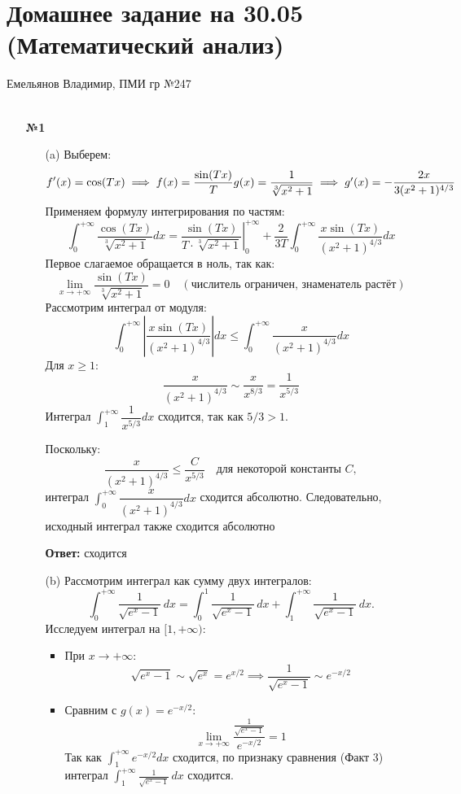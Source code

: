 \documentclass[a4paper]{article}
\renewcommand{\geq}{\geqslant}
\renewcommand{\leq}{\leqslant}
\begin{document}
\section*{Домашнее задание на 30.05 (Математический анализ)}
{\large Емельянов Владимир, ПМИ гр №247}\\\\
\begin{enumerate}
  \item[\textbf{№1}]\begin{enumerate}
    \item[(a)]
    Выберем:  
     \[
     f'(x) = \cos(Tx) \implies f(x) = \dfrac{\sin(Tx)}{T} $$
     $$ g(x) =
      \dfrac{1}{\sqrt[3]{x^2 + 1}} \implies g'(x) = -\dfrac{2x}{3(x^2 + 1)^{4/3}}
     \]  
     Применяем формулу интегрирования по частям:  
     \[
     \int_{0}^{+\infty} \dfrac{\cos(Tx)}{\sqrt[3]{x^2 + 1}} dx = 
     \left. \dfrac{\sin(Tx)}{T \cdot \sqrt[3]{x^2 + 1}} \right|_{0}^{+\infty} +
      \dfrac{2}{3T} \int_{0}^{+\infty} \dfrac{x \sin(Tx)}{(x^2 + 1)^{4/3}} dx
     \]  
     Первое слагаемое обращается в ноль, так как:  
     \[
     \lim_{x \to +\infty} \dfrac{\sin(Tx)}{\sqrt[3]{x^2 + 1}} =
      0 \quad (\text{числитель ограничен, знаменатель растёт})
     \]
     Рассмотрим интеграл от модуля:  
     \[
     \int_{0}^{+\infty} \left| \dfrac{x \sin(Tx)}{(x^2 + 1)^{4/3}}
      \right| dx \leq \int_{0}^{+\infty} \dfrac{x}{(x^2 + 1)^{4/3}} dx
     \]  
     Для \(x \geq 1\):  
     \[
     \dfrac{x}{(x^2 + 1)^{4/3}} \sim \dfrac{x}{x^{8/3}} = \dfrac{1}{x^{5/3}}
     \]  
     Интеграл \(\int_{1}^{+\infty} \dfrac{1}{x^{5/3}} dx\) сходится, так как \(5/3 > 1\).
  
      Поскольку:  
     \[
     \dfrac{x}{(x^2 + 1)^{4/3}} \leq \dfrac{C}{x^{5/3}} \quad 
     \text{для некоторой константы } C,
     \]  
     интеграл \(\int_{0}^{+\infty} \dfrac{x}{(x^2 + 1)^{4/3}} dx\) сходится абсолютно. 
     Следовательно, исходный интеграл также сходится абсолютно
    
     \textbf{Ответ: } сходится\\

     \item[(b)]Рассмотрим интеграл как сумму двух интегралов:  
    \[
    \int_{0}^{+\infty} \frac{1}{\sqrt{e^x - 1}} \, dx = \int_{0}^{1} \frac{1}{\sqrt{e^x - 1}} \, dx + \int_{1}^{+\infty} \frac{1}{\sqrt{e^x - 1}} \, dx.
    \]
    Исследуем интеграл на \([1, +\infty)\):
    \begin{itemize}
      \item При \(x \to +\infty\):  
     \[
     \sqrt{e^x - 1} \sim \sqrt{e^x} = 
     e^{x/2} \implies \frac{1}{\sqrt{e^x - 1}} \sim e^{-x/2}
     \]  
     \item Сравним с \(g(x) = e^{-x/2}\):  
     \[
     \lim_{x \to +\infty} \frac{\frac{1}{\sqrt{e^x - 1}}}{e^{-x/2}} = 1
     \]  
     Так как \(\int_{1}^{+\infty} e^{-x/2} dx\) 
     сходится, по признаку сравнения (Факт 3) интеграл \(\int_{1}^{+\infty}
      \frac{1}{\sqrt{e^x - 1}} \, dx\) сходится.
    \end{itemize}


\end{enumerate}
\end{enumerate}
\end{document}
